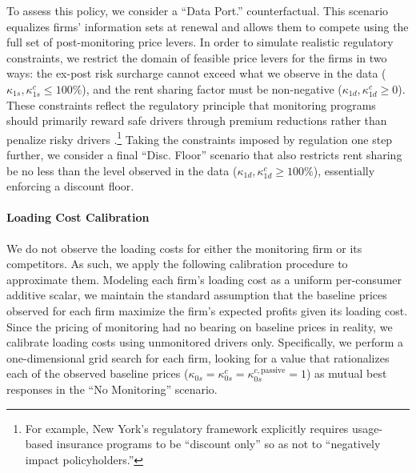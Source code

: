 To assess this policy, we consider a ``Data Port.'' counterfactual. This scenario equalizes firms' information sets at renewal and allows them to compete using the full set of post-monitoring price levers. In order to simulate realistic regulatory constraints, we restrict the domain of feasible price levers for the firms in two ways: the ex-post risk surcharge cannot exceed what we observe in the data ($\kappa_{1s}, \kappa^{c}_{1s} \leq 100\%$), and the rent sharing factor must be non-negative ($\kappa_{1d}, \kappa^{c}_{1d} \geq 0$). These constraints reflect the regulatory principle that monitoring programs should primarily reward safe drivers through premium reductions rather than penalize risky drivers \parencite{ben2023privacy}.\footnote{For example, New York's regulatory framework explicitly requires usage-based insurance programs to be ``discount only'' so as not to ``negatively impact policyholders.''} Taking the constraints imposed by regulation one step further, we consider a final ``Disc. Floor'' scenario that also restricts rent sharing be no less than the level observed in the data ($\kappa_{1d}, \kappa^{c}_{1d} \geq 100\%$), essentially enforcing a discount floor.

\paragraph{Loading Cost Calibration}
We do not observe the loading costs for either the monitoring firm or its competitors. As such, we apply the following calibration procedure to approximate them. Modeling each firm's loading cost as a uniform per-consumer additive scalar, we maintain the standard assumption that the baseline prices observed for each firm maximize the firm's expected profits given its loading cost. Since the pricing of monitoring had no bearing on baseline prices in reality, we calibrate loading costs using unmonitored drivers only. Specifically, we perform a one-dimensional grid search for each firm, looking for a value that rationalizes each of the observed baseline prices ($\kappa_{0s} = \kappa^{c}_{0s} = \kappa^{c,\text{passive}}_{0s} = 1$) as mutual best responses in the ``No Monitoring'' scenario.

